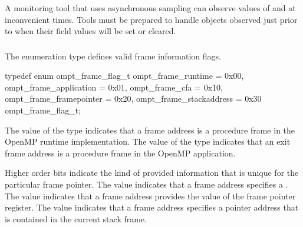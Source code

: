 \begin{note}
A monitoring tool that uses asynchronous sampling can observe values
of  and  at inconvenient times.
Tools must be prepared to handle  objects observed 
just prior to when their field values will be set or cleared.
\end{note}



\subsubsection{}
\label{subsubsec:ompt_frame_flag_t}

\summary
The  enumeration type defines valid frame 
information flags.

\clearpage  %
\format
\begin{ccppspecific}
\begin{ompSyntax}
typedef enum ompt_frame_flag_t {
  ompt_frame_runtime        = 0x00,
  ompt_frame_application    = 0x01,
  ompt_frame_cfa            = 0x10,
  ompt_frame_framepointer   = 0x20,
  ompt_frame_stackaddress   = 0x30
} ompt_frame_flag_t; 
\end{ompSyntax}
\end{ccppspecific}

\descr
The value  of the  type
indicates that a frame address is a procedure frame in the OpenMP runtime 
implementation. The value  of the 
 type indicates that an exit frame address is a 
procedure frame in the OpenMP application.

Higher order bits indicate the kind of provided information that is unique
for the particular frame pointer. The value  indicates 
that a frame address specifies a . The value 
 indicates that a frame address provides the 
value of the frame pointer register. The value  
indicates that a frame address specifies a pointer address that is
contained in the current stack frame.
